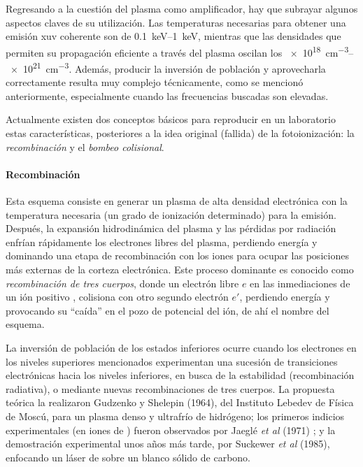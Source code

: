 Regresando a la cuestión del plasma como amplificador, hay que subrayar algunos aspectos claves de su utilización. Las temperaturas necesarias para obtener una emisión \acrshort{xuv} coherente son de \qtyrange{0.1}{1}{keV}, mientras que las densidades que permiten su propagación eficiente a través del plasma oscilan los \qtyrange{e18}{e21}{cm^{-3}}. Además, producir la inversión de población y aprovecharla correctamente resulta muy complejo técnicamente, como se mencionó anteriormente, especialmente cuando las frecuencias buscadas son elevadas. 

Actualmente existen dos conceptos básicos para reproducir en un laboratorio estas características, posteriores a la idea original (fallida) de la fotoionización: la \emph{recombinación} y el \emph{bombeo colisional}. 

\paragraph{Recombinación}
Esta esquema consiste en generar un plasma de alta densidad electrónica con la temperatura necesaria (un grado de ionización determinado) para la emisión. Después, la expansión hidrodinámica del plasma y las pérdidas por radiación enfrían rápidamente los electrones libres del plasma, perdiendo energía y dominando una etapa de recombinación con los iones para ocupar las posiciones más externas de la corteza electrónica. Este proceso dominante es conocido como \emph{recombinación de tres cuerpos}, donde un electrón libre $e$ en las inmediaciones de un ión positivo , colisiona con otro segundo electrón $e \prime $, perdiendo energía y provocando su \enquote{caída} en el pozo de potencial del ión, de ahí el nombre del esquema.

La inversión de población de los estados inferiores ocurre cuando los electrones en los niveles superiores mencionados experimentan una sucesión de transiciones electrónicas hacia los niveles inferiores, en busca de la estabilidad (recombinación radiativa), o mediante nuevas recombinaciones de tres cuerpos. La propuesta teórica la realizaron Gudzenko y Shelepin (1964), del Instituto Lebedev de Física de Moscú\autocite{Gudzenko1964}, para un plasma denso y ultrafrío de hidrógeno; los primeros indicios experimentales (en iones de ) fueron observados por Jaeglé \emph{et al} (1971) \autocite{Jaegle1971}; y la demostración experimental unos años más tarde, por Suckewer \emph{et al} (1985)\autocite{Suckewer1985}, enfocando un láser de  sobre un blanco sólido de carbono.

